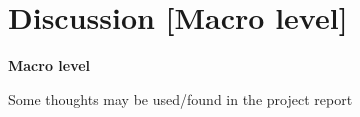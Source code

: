 
\chapter{Discussion [Macro level]}\label{chpt:discussion}
\textbf{Macro level}

Some thoughts may be used/found in the project report

\cleardoublepage